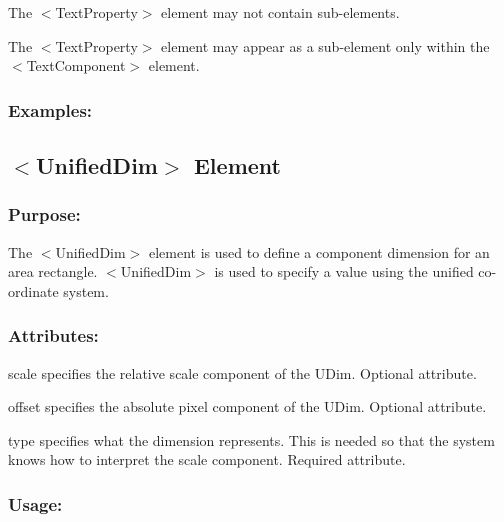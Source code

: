 \begin{DoxyItemize}
\item The {\ttfamily $<$Text\+Property$>$} element may not contain sub-\/elements. 
\item The {\ttfamily $<$Text\+Property$>$} element may appear as a sub-\/element only within the {\ttfamily $<$Text\+Component$>$} element. 
\end{DoxyItemize}\hypertarget{fal_element_ref_fal_elem_ref_sec_33_4}{}\subsubsection{Examples\+:}\label{fal_element_ref_fal_elem_ref_sec_33_4}
\hypertarget{fal_element_ref_fal_elem_ref_sec_34}{}\subsection{$<$\+Unified\+Dim$>$ Element}\label{fal_element_ref_fal_elem_ref_sec_34}
\hypertarget{fal_element_ref_fal_elem_ref_sec_34_1}{}\subsubsection{Purpose\+:}\label{fal_element_ref_fal_elem_ref_sec_34_1}
The {\ttfamily $<$Unified\+Dim$>$} element is used to define a component dimension for an area rectangle. {\ttfamily $<$Unified\+Dim$>$} is used to specify a value using the \textquotesingle{}unified\textquotesingle{} co-\/ordinate system.\hypertarget{fal_element_ref_fal_elem_ref_sec_34_2}{}\subsubsection{Attributes\+:}\label{fal_element_ref_fal_elem_ref_sec_34_2}
\begin{DoxyItemize}
\item {\ttfamily scale} specifies the relative scale component of the U\+Dim. Optional attribute. \item {\ttfamily offset} specifies the absolute pixel component of the U\+Dim. Optional attribute. \item {\ttfamily type} specifies what the dimension represents. This is needed so that the system knows how to interpret the \textquotesingle{}scale\textquotesingle{} component. Required attribute.\end{DoxyItemize}
\hypertarget{fal_element_ref_fal_elem_ref_sec_34_3}{}\subsubsection{Usage\+:}\label{fal_element_ref_fal_elem_ref_sec_34_3}

